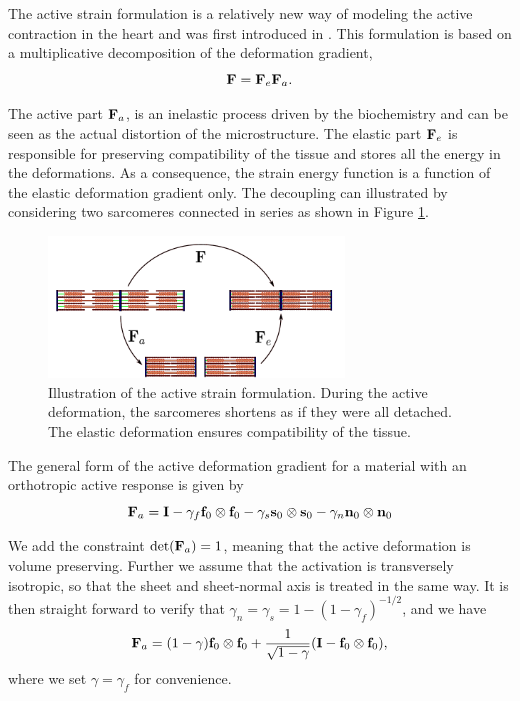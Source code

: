 The active strain formulation is a relatively new way of modeling the
active contraction in the heart and was first introduced in
\cite{taber2000modeling}. This formulation is based on a
multiplicative decomposition of the deformation gradient, 
\begin{equation}
 \mathbf{F} = \mathbf{F}_e \mathbf{F}_a.
\label{eq:active_strain}
\end{equation}


The active part $\mathbf{F}_a$, is an inelastic process driven by the
biochemistry and can be seen as the actual distortion of the
microstructure. The elastic part $\mathbf{F}_e$ is responsible for preserving
compatibility of the tissue and stores all the energy in the
deformations. As a consequence, the strain energy function is a
function of the elastic deformation gradient only. The
decoupling can illustrated by considering two sarcomeres connected in
series as shown in Figure \ref{fig:actstrain}. 

\begin{figure}[htbp]
  \centering
    \includegraphics[width=0.7\textwidth]{chapters/introduction/figures/actstrain.pdf}
\caption{Illustration of the active strain formulation. During the active
deformation, the sarcomeres shortens as if they were all detached. The
elastic deformation ensures compatibility of the tissue.}
\label{fig:actstrain}
\end{figure}


The general form of the active deformation gradient for a
material with an orthotropic active response is given by
\begin{equation}
  \mathbf{F}_a =  \mathbf{I}
  - \gamma_f \mathbf{f}_0 \otimes \mathbf{f}_0
  - \gamma_s \mathbf{s}_0 \otimes \mathbf{s}_0
  - \gamma_n \mathbf{n}_0\otimes \mathbf{n}_0
 \label{eq:active_strain_Fa_general}
\end{equation}

We add the constraint $\det(\mathbf{F}_a) = 1$, meaning that the active
deformation is volume preserving. Further we assume that the activation is
transversely isotropic, so that the sheet and sheet-normal axis is
treated in the same way. It is then straight forward to verify that
$\gamma_n = \gamma_s =1- (1-\gamma_f)^{-1/2}$, and we have
\begin{equation}
  \mathbf{F}_a = (1 - \gamma) \mathbf{f}_0 \otimes \mathbf{f}_0  + \frac{1}{\sqrt{1 - \gamma}} (\mathbf{I} - \mathbf{f}_0 \otimes \mathbf{f}_0), 
 \label{eq:intro_active_strain_Fa_gjerald}
\end{equation}
where we set $\gamma = \gamma_f$ for convenience. 


